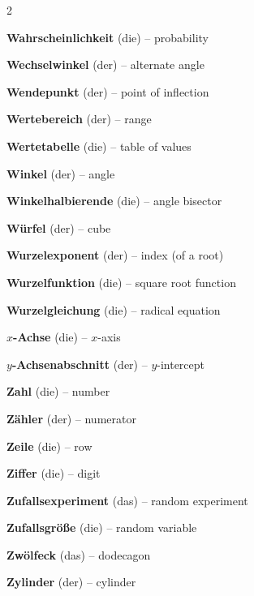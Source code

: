 \begin{multicols}{2}
\par\nopagebreak
\textbf{Wahrscheinlichkeit} (die) -- probability\dotfill\hyperref[e:330]{\pageref*{e:330}}\par
\textbf{Wechselwinkel} (der) -- alternate angle\dotfill\hyperref[e:168]{\pageref*{e:168}}\par
\textbf{Wendepunkt} (der) -- point of inflection\dotfill\hyperref[e:284]{\pageref*{e:284}}\par
\textbf{Wertebereich} (der) -- range\dotfill\hyperref[e:110]{\pageref*{e:110}}\par
\textbf{Wertetabelle} (die) -- table of values\dotfill\hyperref[e:112]{\pageref*{e:112}}\par
\textbf{Winkel} (der) -- angle\dotfill\hyperref[e:153]{\pageref*{e:153}}\par
\textbf{Winkelhalbierende} (die) -- angle bisector\dotfill\hyperref[e:156]{\pageref*{e:156}}\par
\textbf{Würfel} (der) -- cube\dotfill\hyperref[e:226]{\pageref*{e:226}}\par
\textbf{Wurzelexponent} (der) -- index (of a root)\dotfill\hyperref[e:49]{\pageref*{e:49}}\par
\textbf{Wurzelfunktion} (die) -- square root function\dotfill\hyperref[e:128]{\pageref*{e:128}}\par
\textbf{Wurzelgleichung} (die) -- radical equation\dotfill\hyperref[e:83]{\pageref*{e:83}}\par

\par\nopagebreak
\textbf{$x$-Achse} (die) -- $x$-axis\dotfill\hyperref[e:114]{\pageref*{e:114}}\par

\par\nopagebreak
\textbf{$y$-Achsenabschnitt} (der) -- $y$-intercept\dotfill\hyperref[e:121]{\pageref*{e:121}}\par

\par\nopagebreak
\textbf{Zahl} (die) -- number\dotfill\hyperref[e:1]{\pageref*{e:1}}\par
\textbf{Zähler} (der) -- numerator\dotfill\hyperref[e:29]{\pageref*{e:29}}\par
\textbf{Zeile} (die) -- row\dotfill\hyperref[e:322]{\pageref*{e:322}}\par
\textbf{Ziffer} (die) -- digit\dotfill\hyperref[e:2]{\pageref*{e:2}}\par
\textbf{Zufallsexperiment} (das) -- random experiment\dotfill\hyperref[e:326]{\pageref*{e:326}}\par
\textbf{Zufallsgröße} (die) -- random variable\dotfill\hyperref[e:334]{\pageref*{e:334}}\par
\textbf{Zwölfeck} (das) -- dodecagon\dotfill\hyperref[e:208]{\pageref*{e:208}}\par
\textbf{Zylinder} (der) -- cylinder\dotfill\hyperref[e:229]{\pageref*{e:229}}\par
\end{multicols}

